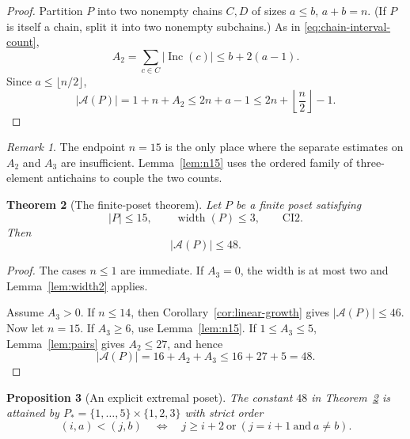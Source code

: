 \documentclass[11pt]{article}
\numberwithin{equation}{section}
\newtheorem{theorem}{Theorem}[section]
\newtheorem{proposition}[theorem]{Proposition}
\theoremstyle{definition}
\theoremstyle{remark}
\newtheorem{remark}[theorem]{Remark}
\newcommand{\Inc}{\operatorname{Inc}}
\newcommand{\A}{\mathcal A}
\begin{document}
\begin{proof}
Partition $P$ into two nonempty chains $C,D$ of sizes $a\le b$,
$a+b=n$.  (If $P$ is itself a chain, split it into two nonempty
subchains.)  As in \eqref{eq:chain-interval-count},
\[
        A_2=\sum_{c\in C}|\Inc(c)|
        \le b+2(a-1).
\]
Since $a\le\lfloor n/2\rfloor$,
\[
        |\A(P)|=1+n+A_2
        \le 2n+a-1
        \le 2n+\left\lfloor\frac n2\right\rfloor-1.
\]
\end{proof}

\begin{remark}
The endpoint $n=15$ is the only place where the separate estimates on
$A_2$ and $A_3$ are insufficient.  Lemma~\ref{lem:n15} uses the ordered
family of three-element antichains to couple the two counts.
\end{remark}

\begin{theorem}[The finite-poset theorem]\label{thm:poset48}
Let $P$ be a finite poset satisfying
\[
        |P|\le15,\qquad \operatorname{width}(P)\le3,
        \qquad \mathrm{CI2}.
\]
Then
\[
        |\A(P)|\le48.
\]
\end{theorem}

\begin{proof}
The cases $n\le1$ are immediate.  If $A_3=0$, the width is at most two
and Lemma~\ref{lem:width2} applies.

Assume $A_3>0$.  If $n\le14$, then
Corollary~\ref{cor:linear-growth} gives $|\A(P)|\le46$.
Now let $n=15$.  If $A_3\ge6$, use Lemma~\ref{lem:n15}.  If
$1\le A_3\le5$, Lemma~\ref{lem:pairs} gives $A_2\le27$, and hence
\[
        |\A(P)|=16+A_2+A_3\le16+27+5=48.
\]
\end{proof}

\begin{proposition}[An explicit extremal poset]\label{prop:explicit-extremal}
The constant $48$ in Theorem~\ref{thm:poset48} is attained by
$P_* = \{1,\ldots,5\}\times\{1,2,3\}$ with strict order
\begin{equation}\label{eq:explicit-order}
(i,a)<(j,b)\quad\Longleftrightarrow\quad
j\ge i+2\ \text{or}\ (j=i+1\ \text{and}\ a\ne b).
\end{equation}
\end{proposition}
\end{document}
